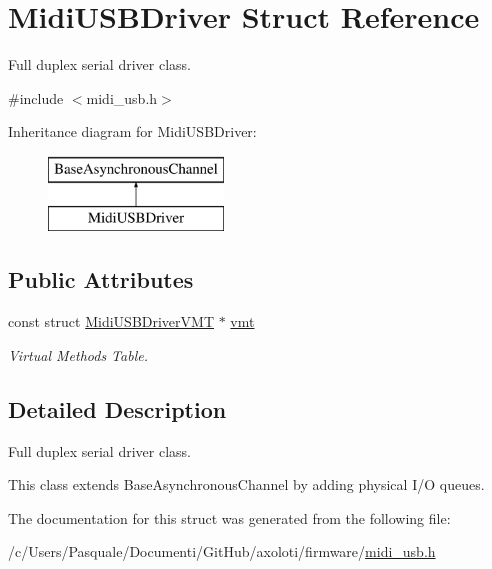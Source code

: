 \hypertarget{structMidiUSBDriver}{}\section{Midi\+U\+S\+B\+Driver Struct Reference}
\label{structMidiUSBDriver}


Full duplex serial driver class.  




{\ttfamily \#include $<$midi\+\_\+usb.\+h$>$}

Inheritance diagram for Midi\+U\+S\+B\+Driver\+:\begin{figure}[H]
\begin{center}
\leavevmode
\includegraphics[height=2.000000cm]{structMidiUSBDriver}
\end{center}
\end{figure}
\subsection*{Public Attributes}
\begin{DoxyCompactItemize}
\item 
const struct \hyperlink{structMidiUSBDriverVMT}{Midi\+U\+S\+B\+Driver\+V\+MT} $\ast$ \hyperlink{structMidiUSBDriver_a284fcf42283692d4626add45fa497cd5}{vmt}\hypertarget{structMidiUSBDriver_a284fcf42283692d4626add45fa497cd5}{}\label{structMidiUSBDriver_a284fcf42283692d4626add45fa497cd5}

\begin{DoxyCompactList}\small\item\em Virtual Methods Table. \end{DoxyCompactList}\end{DoxyCompactItemize}


\subsection{Detailed Description}
Full duplex serial driver class. 

This class extends {\ttfamily Base\+Asynchronous\+Channel} by adding physical I/O queues. 

The documentation for this struct was generated from the following file\+:\begin{DoxyCompactItemize}
\item 
/c/\+Users/\+Pasquale/\+Documenti/\+Git\+Hub/axoloti/firmware/\hyperlink{midi__usb_8h}{midi\+\_\+usb.\+h}\end{DoxyCompactItemize}
